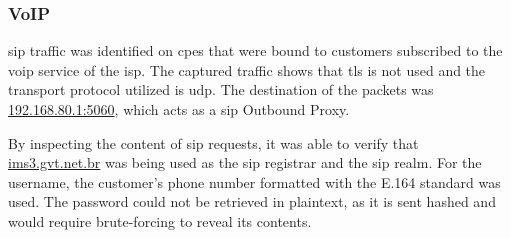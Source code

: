 \subsubsection{VoIP}

\gls{sip} traffic was identified on \glspl{cpe} that were bound to customers subscribed to the \gls{voip} service of the \gls{isp}. The captured traffic shows that \gls{tls} is not used and the transport protocol utilized is \gls{udp}. The destination of the packets was \url{192.168.80.1:5060}, which acts as a \gls{sip} Outbound Proxy.

By inspecting the content of \gls{sip} requests, it was able to verify that \url{ims3.gvt.net.br} was being used as the \gls{sip} registrar and the \gls{sip} realm. For the username, the customer’s phone number formatted with the E.164 standard was used. The password could not be retrieved in plaintext, as it is sent hashed and would require brute-forcing to reveal its contents.
